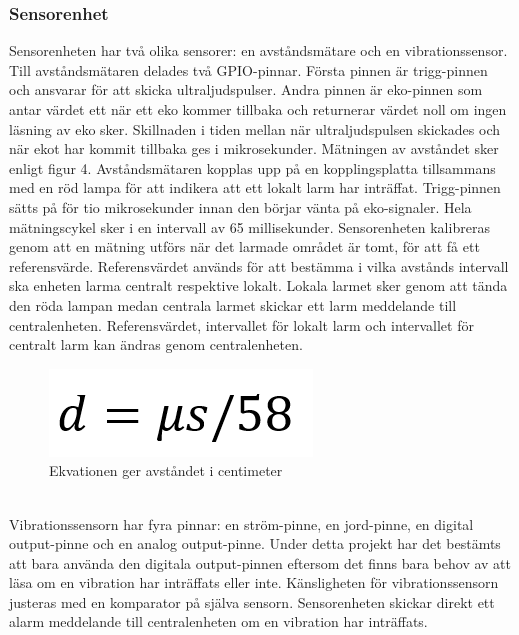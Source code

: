 \documentclass{article}
\begin{document}
\subsubsection{Sensorenhet}
Sensorenheten har två olika sensorer: en avståndsmätare och en vibrationssensor. Till avståndsmätaren delades två GPIO-pinnar. Första pinnen är trigg-pinnen och ansvarar för att skicka ultraljudspulser. Andra pinnen är eko-pinnen som antar värdet ett när ett eko kommer tillbaka och returnerar värdet noll om ingen läsning av eko sker. Skillnaden i tiden mellan när ultraljudspulsen skickades och när ekot har kommit tillbaka ges i mikrosekunder. Mätningen av avståndet sker enligt figur 4. Avståndsmätaren kopplas upp på en kopplingsplatta tillsammans med en röd lampa för att indikera att ett lokalt larm har inträffat. Trigg-pinnen sätts på för tio mikrosekunder innan den börjar vänta på eko-signaler. Hela mätningscykel sker i en intervall av 65 millisekunder. Sensorenheten kalibreras genom att en mätning utförs när det larmade området är tomt, för att få ett referensvärde. Referensvärdet används för att bestämma i vilka avstånds intervall ska enheten larma centralt respektive lokalt. Lokala larmet sker genom att tända den röda lampan medan centrala larmet skickar ett larm meddelande till centralenheten. Referensvärdet, intervallet för lokalt larm och intervallet för centralt larm kan ändras genom centralenheten.
\begin{figure}[h]
    \centering
    \includegraphics[scale=0.5]{Projektrapport/ekvation.png}
    \caption {Ekvationen ger avståndet i centimeter }
    \label{fig:drawing}
\end{figure}
\\
Vibrationssensorn har fyra pinnar: en ström-pinne, en jord-pinne, en digital output-pinne och en analog output-pinne. Under detta projekt har det bestämts att bara använda den digitala output-pinnen eftersom det finns bara behov av att läsa om en vibration har inträffats eller inte. Känsligheten för vibrationssensorn justeras med en komparator på själva sensorn. Sensorenheten skickar direkt ett alarm meddelande till centralenheten om en vibration har inträffats.
\end{document}
